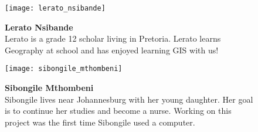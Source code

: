 \begin{figure}[ht]
\begin{center}
\vspace{0.1cm}

\begin{minipage}[h]{5cm}\texttt{[image: lerato\_nsibande]}
\end{minipage}
\begin{minipage}[h]{11.5cm}
\textbf{Lerato Nsibande} \\
Lerato is a grade 12 scholar living in Pretoria. Lerato learns Geography at
school and has enjoyed learning GIS with us!
\end{minipage}

\vspace{0.1cm}

\begin{minipage}[h]{5cm}\texttt{[image: sibongile\_mthombeni]}
\end{minipage}
\begin{minipage}[h]{11.5cm}
\textbf{Sibongile Mthombeni} \\
Sibongile lives near Johannesburg with her young daughter. Her goal is to
continue her studies and become a nurse. Working on this project was the
first time Sibongile used a computer.
\end{minipage}
\end{center}
\end{figure}


